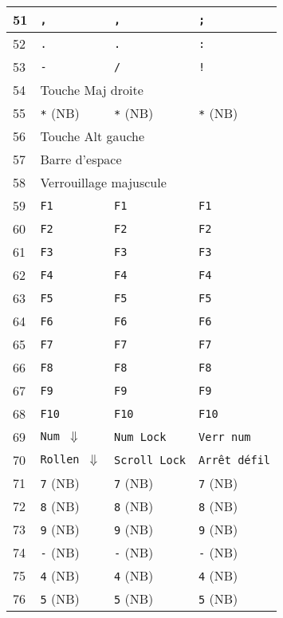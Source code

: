 \begin{longtable}{|l|l|l|l|}
  51 & \texttt{,} & \texttt{,} & \texttt{;} \\ \hline
  52 & \texttt{.} & \texttt{.} & \texttt{:} \\ \hline
  53 & \texttt{-} & \texttt{/} & \texttt{!} \\ \hline
  54 & \multicolumn{3}{|l|}{Touche Maj droite} \\ \hline
  55 & \texttt{*} (NB) & \texttt{*} (NB) & \texttt{*} (NB) \\ \hline
  56 & \multicolumn{3}{|l|}{Touche Alt gauche} \\ \hline
  57 & \multicolumn{3}{|l|}{Barre d'espace} \\ \hline
  58 & \multicolumn{3}{|l|}{Verrouillage majuscule} \\ \hline
  59 & \texttt{F1} & \texttt{F1} & \texttt{F1} \\ \hline
  60 & \texttt{F2} & \texttt{F2} & \texttt{F2} \\ \hline
  61 & \texttt{F3} & \texttt{F3} & \texttt{F3} \\ \hline
  62 & \texttt{F4} & \texttt{F4} & \texttt{F4} \\ \hline
  63 & \texttt{F5} & \texttt{F5} & \texttt{F5} \\ \hline
  64 & \texttt{F6} & \texttt{F6} & \texttt{F6} \\ \hline
  65 & \texttt{F7} & \texttt{F7} & \texttt{F7} \\ \hline
  66 & \texttt{F8} & \texttt{F8} & \texttt{F8} \\ \hline
  67 & \texttt{F9} & \texttt{F9} & \texttt{F9} \\ \hline
  68 & \texttt{F10} & \texttt{F10} & \texttt{F10} \\ \hline
  69 & \texttt{Num $\Downarrow$} & \texttt{Num Lock} & \texttt{Verr num} \\ \hline
  70 & \texttt{Rollen $\Downarrow$} & \texttt{Scroll Lock} & \texttt{Arrêt défil} \\ \hline
  71 & \texttt{7} (NB) & \texttt{7} (NB) & \texttt{7} (NB) \\ \hline
  72 & \texttt{8} (NB) & \texttt{8} (NB) & \texttt{8} (NB) \\ \hline
  73 & \texttt{9} (NB) & \texttt{9} (NB) & \texttt{9} (NB) \\ \hline
  74 & \texttt{-} (NB) & \texttt{-} (NB) & \texttt{-} (NB) \\ \hline
  75 & \texttt{4} (NB) & \texttt{4} (NB) & \texttt{4} (NB) \\ \hline
  76 & \texttt{5} (NB) & \texttt{5} (NB) & \texttt{5} (NB) \\ \hline

\end{longtable}
